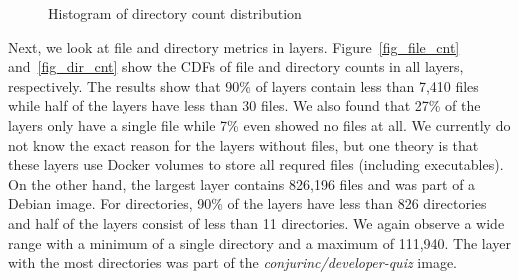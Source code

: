 \begin{figure}[!t]
	\centering
	\caption{Histogram of directory count distribution}
	\label{fig:reference-cnt}
\end{figure}

Next, we look at file and directory metrics in layers.
Figure~\ref{fig_file_cnt} and~\ref{fig_dir_cnt} show the CDFs of file
and directory counts in all layers, respectively.
%
The results show that 90\% of layers contain less than 7,410 files while half
of the layers have less than 30 files.
%
We also found that 27\% of the layers only have a single file while 7\% even showed
no files at all. We currently do not know the exact reason for the layers without files,
but one theory is that these layers use Docker volumes to store
all requred files (including executables).
On the other hand,
the largest layer contains 826,196 files and was part of a Debian image.
%
%
For directories, 90\% of the layers have less than 826 directories and half of the layers consist
of less than 11 directories. We again observe a wide range with a minimum of a single directory
and a maximum of 111,940. The layer with the most directories was part of
the \textit{conjurinc/developer-quiz} image.



